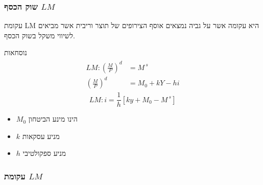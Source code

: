 \documentclass[usenames,dvipsnames]{beamer}
\begin{document}
        \begin{RTL}
        
            
        \begin{frame}
            \frametitle{שוק הכסף $LM$}
            עקומת LM היא עקומה אשר על גביה נמצאים אוסף הצירופים של תוצר וריבית אשר מביאים לשיווי משקל
בשוק הכסף. 
\begin{block}{נוסחאות}
    \begin{align*}
        \begin{split}
           LM : \left(\frac{M}{P}\right) ^ d  & = M ^ {\ s} \\ 
           \left(\frac{M}{P}  \right) ^ d    & = M_0 + kY - hi 
        \end{split}
    \end{align*}
    \begin{equation*}
        LM : i  = \frac{1}{h} \left[ky + M_0 - M^{\ s} \right]
    \end{equation*}
\end{block}

\begin{itemize}
    \item $M_0$ הינו מינע הביטחון
    \item $k$ מניע עסקאות
    \item $h$ מניע ספקולטיבי
\end{itemize}
        
            
        
        \end{frame}

        \begin{frame}
            \frametitle{עקומת $LM$}
            \begin{flushleft}
        \end{flushleft}
            
            
        
        \end{frame}


\end{RTL}
\end{document}
